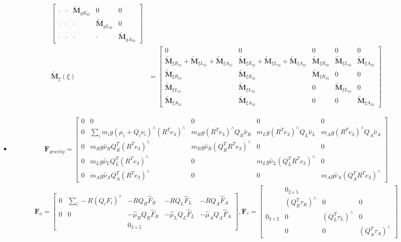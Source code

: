 \documentclass[10pt]{article}
\begin{document}
\begin{itemize}
\begin{align*}
\begin{bmatrix}
	\cdot & \cdot & \tilde{\mathbf{M}}_{gR_{33}} & 0 & 0 \\
	\cdot & \cdot & \cdot & \tilde{\mathbf{M}}_{gL_{33}} & 0 \\
	\cdot & \cdot & \cdot & \cdot & \tilde{\mathbf{M}}_{gA_{33}}
	\end{bmatrix}
	\\
	{\tilde{\mathbf{M}}_\xi}(\xi) &= \begin{bmatrix}
	0 & 0 & 0 & 0 & 0 \\
	\tilde{\mathbf{M}}_{\xi R_{21}} + \tilde{\mathbf{M}}_{\xi L_{21}} + \tilde{\mathbf{M}}_{\xi A_{21}} & \tilde{\mathbf{M}}_{\xi R_{22}} + \tilde{\mathbf{M}}_{\xi L_{22}} + \tilde{\mathbf{M}}_{\xi A_{22}}
	& \tilde{\mathbf{M}}_{\xi R_{23}} 
	& \tilde{\mathbf{M}}_{\xi L_{23}} 
	& \tilde{\mathbf{M}}_{\xi A_{23}} \\
	\tilde{\mathbf{M}}_{\xi R_{31}} & \tilde{\mathbf{M}}_{\xi R_{32}} &  \tilde{\mathbf{M}}_{\xi R_{33}}
	& 0 & 0 \\
	\tilde{\mathbf{M}}_{\xi L_{31}} & \tilde{\mathbf{M}}_{\xi L_{32}} & 0
	& \tilde{\mathbf{M}}_{\xi L_{33}} & 0 \\
	\tilde{\mathbf{M}}_{\xi A_{31}} & \tilde{\mathbf{M}}_{\xi A_{32}} & 0 & 0 & \tilde{\mathbf{M}}_{\xi A_{33}}
	\end{bmatrix}
	\end{align*}
	\item
	{\small \begin{align*}
	\mathbf{F}_{gravity} = \begin{bmatrix}
	0 & 0 & 0 & 0 & 0 \\
	0 & \sum_{i} m_i g (\mu_i + Q_i \nu_i)^\wedge (R^T e_3)^\wedge & m_Rg (R^T e_3)^\wedge Q_R \hat{\nu}_R & m_Lg (R^T e_3)^\wedge Q_L \hat{\nu}_L & m_Ag (R^T e_3)^\wedge Q_A \hat{\nu}_A \\
	0 & m_R g \hat\nu_R Q_R^T (R^T e_3)^\wedge & m_R g \hat\nu_R (Q_R^T R^T e_3)^\wedge & 0 & 0\\
	0 & m_L g \hat\nu_L Q_L^T (R^T e_3)^\wedge & 0 & m_L g \hat\nu_L (Q_L^T R^T e_3)^\wedge & 0 \\
	0 & m_A g \hat\nu_A Q_A^T (R^T e_3)^\wedge & 0 & 0 & m_A g \hat\nu_A (Q_A^T R^T e_3)^\wedge
	\end{bmatrix}
	\end{align*}
	\begin{align*}
	\mathbf{F}_a =  \begin{bmatrix}
	0 & \sum_{i} -R(Q_i F_i)^\wedge & -RQ_R\hat{F}_R & -RQ_L\hat{F}_L & -RQ_A\hat{F}_A \\
	0 & 0 & -\hat{\mu}_R Q_R \hat{F}_R & -\hat{\mu}_L Q_L \hat{F}_L & -\hat{\mu}_A Q_A \hat{F}_A\\
	& & 0_{3 \times 5} & &
	\end{bmatrix}
	,\mathbf{F}_\tau = \begin{bmatrix}
	& 0_{2\times 5} &  &  \\
	& (Q_R^T \tau_R)^\wedge & 0 & 0 \\
	0_{3 \times 2} & 0 & (Q_L^T \tau_L)^\wedge & 0 \\
	&  0 & 0 & (Q_A^T \tau_A)^\wedge
	\end{bmatrix}
	\end{align*}}
\end{itemize}
\end{document}
